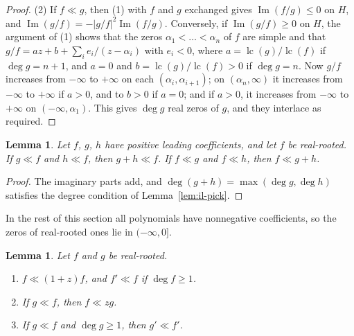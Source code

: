 \documentclass[11pt]{amsart}
\newtheorem{lemma}[theorem]{Lemma}
\theoremstyle{definition}
\DeclareMathOperator{\lc}{lc}
\begin{document}
\begin{proof}
(2) If $f\ll g$, then (1) with $f$ and $g$ exchanged gives $\operatorname{Im}(f/g)\le0$ on $H$, and $\operatorname{Im}(g/f)=-|g/f|^2\operatorname{Im}(f/g)$. Conversely, if $\operatorname{Im}(g/f)\ge0$ on $H$, the argument of (1) shows that the zeros $\alpha_1<\dots<\alpha_n$ of $f$ are simple and that $g/f=az+b+\sum_ie_i/(z-\alpha_i)$ with $e_i<0$, where $a=\lc(g)/\lc(f)$ if $\deg g=n+1$, and $a=0$ and $b=\lc(g)/\lc(f)>0$ if $\deg g=n$. Now $g/f$ increases from $-\infty$ to $+\infty$ on each $(\alpha_i,\alpha_{i+1})$; on $(\alpha_n,\infty)$ it increases from $-\infty$ to $+\infty$ if $a>0$, and to $b>0$ if $a=0$; and if $a>0$, it increases from $-\infty$ to $+\infty$ on $(-\infty,\alpha_1)$. This gives $\deg g$ real zeros of $g$, and they interlace as required.
\end{proof}

\begin{lemma}\label{lem:il-sum}
Let $f$, $g$, $h$ have positive leading coefficients, and let $f$ be real-rooted. If $g\ll f$ and $h\ll f$, then $g+h\ll f$. If $f\ll g$ and $f\ll h$, then $f\ll g+h$.
\end{lemma}

\begin{proof}
The imaginary parts add, and $\deg(g+h)=\max(\deg g,\deg h)$ satisfies the degree condition of Lemma~\ref{lem:il-pick}.
\end{proof}

In the rest of this section all polynomials have nonnegative coefficients, so the zeros of real-rooted ones lie in $(-\infty,0]$.

\begin{lemma}\label{lem:il-ops}
Let $f$ and $g$ be real-rooted.
\begin{enumerate}
\item $f\ll(1+z)f$, and $f'\ll f$ if $\deg f\ge1$.
\item If $g\ll f$, then $f\ll zg$.
\item If $g\ll f$ and $\deg g\ge1$, then $g'\ll f'$.
\end{enumerate}
\end{lemma}
\end{document}
